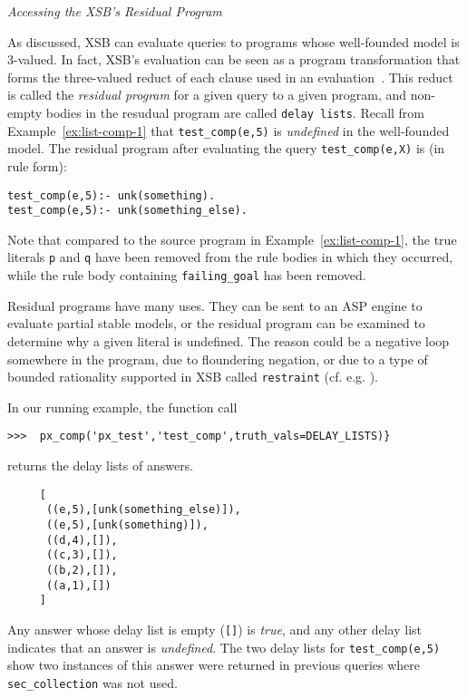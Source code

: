 \begin{example} \rm {\it Accessing the XSB's Residual Program} \label{ex:px-comp-undef}

As discussed, XSB can evaluate queries to programs whose well-founded
model is 3-valued.  In fact, XSB's evaluation can be seen as a program
transformation that forms the three-valued reduct of each clause used
in an evaluation~\cite{ChWa96}.  This reduct is called the {\em
  residual program} for a given query to a given program, and
non-empty bodies in the resudual program are called {\tt delay lists}.
Recall from Example~\ref{ex:list-comp-1} that {\tt test\_comp(e,5)} is
{\em undefined} in the well-founded model.  The residual program after
evaluating the query {\tt test\_comp(e,X)} is (in rule form):

\begin{verbatim}
test_comp(e,5):- unk(something).
test_comp(e,5):- unk(something_else).
\end{verbatim}

Note that compared to the source program in
Example~\ref{ex:list-comp-1}, the true literals {\tt p} and {\tt q}
have been removed from the rule bodies in which they occurred, while
the rule body containing {\tt failing\_goal} has been removed.

Residual programs have many uses.  They can be sent to an ASP engine
to evaluate partial stable models, or the residual program can be
examined to determine why a given literal is undefined. The reason
could be a negative loop somewhere in the program, due to floundering
negation, or due to a type of bounded rationality supported in XSB
called {\tt restraint} (cf. e.g. \cite{GroS13}).

In our running example, the function call

\begin{verbatim}  
>>>  px_comp('px_test','test_comp',truth_vals=DELAY_LISTS)}
\end{verbatim}

\noindent
returns the delay lists of answers.  

\begin{verbatim}
     [
      ((e,5),[unk(something_else)]),
      ((e,5),[unk(something)]),
      ((d,4),[]),
      ((c,3),[]),
      ((b,2),[]),
      ((a,1),[]) 
     ]
\end{verbatim}

Any answer whose delay list is empty ({\tt []}) is {\em true}, and any
other delay list indicates that an answer is {\em undefined}.  The two
delay lists for {\tt test\_comp(e,5)} show two instances of this
answer were returned in previous queries where {\tt sec\_collection}
was not used.
  \end{example}


